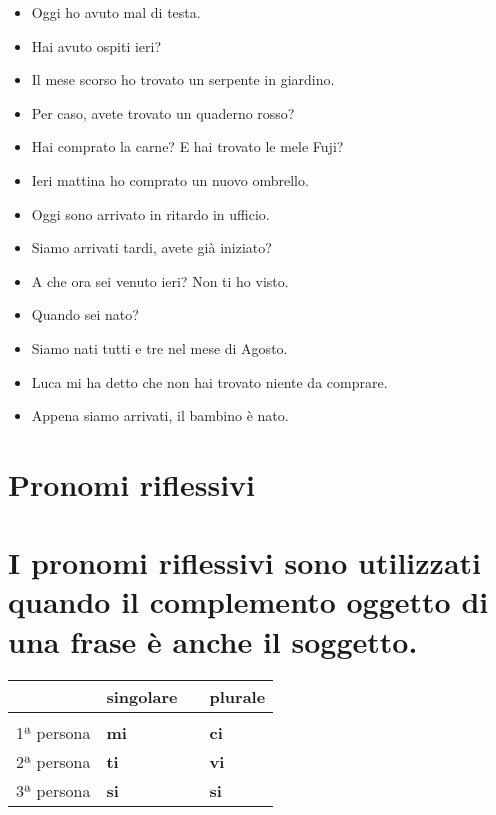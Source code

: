 \documentclass[letter,11pt]{article}
\begin{document}
\vskip 0.5in


\begin{multicols}{2}
\begin{itemize}
    \item Oggi ho avuto mal di testa.
    \item Hai avuto ospiti ieri?
    \item Il mese scorso ho trovato un serpente in giardino.
    \item Per caso, avete trovato un quaderno rosso?
    \item Hai comprato la carne? E hai trovato le mele Fuji?
    \item Ieri mattina ho comprato un nuovo ombrello.
    \item Oggi sono arrivato in ritardo in ufficio.
    \item Siamo arrivati tardi, avete già iniziato?
    \item A che ora sei venuto ieri? Non ti ho visto.
    \item Quando sei nato?
    \item Siamo nati tutti e tre nel mese di Agosto.
    \item Luca mi ha detto che non hai trovato niente da comprare.
    \item Appena siamo arrivati, il bambino è nato.

\end{itemize}
\end{multicols}

\vskip 0.2in

\section*{Pronomi riflessivi}
\section*{I pronomi riflessivi sono utilizzati quando il complemento oggetto di una frase è anche il soggetto.}
\vskip 0.2in

\begin{tabular}{ |p{3cm}| p{2cm}| p{0.2cm}| p{2cm}| }
      & singolare  &    &   plurale  \\
    \hline
    \hline
     &  &      &  \\ \hline
    1ª persona & {\bf mi}   &   &  {\bf ci}  \\ \hline
    2ª persona & {\bf ti}   &   &  {\bf vi}  \\ \hline
    3ª persona & {\bf si}   &   &  {\bf si}  \\ \hline
    \hline
\end{tabular}
\end{document}
